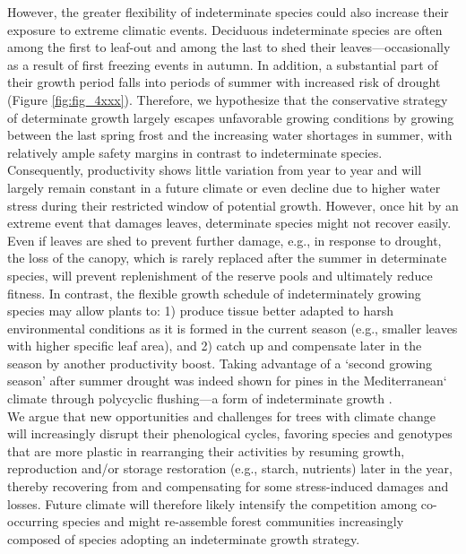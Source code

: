 \documentclass{article}
\begin{document}
However, the greater flexibility of indeterminate species could also increase their exposure to extreme climatic events. Deciduous indeterminate species are often among the first to leaf-out and among the last to shed their leaves---occasionally as a result of first freezing events in autumn. In addition, a substantial part of their growth period falls into periods of summer with increased risk of drought (Figure \ref{fig:fig_4xxx}). 
Therefore, we hypothesize that the conservative strategy of determinate growth largely escapes unfavorable growing conditions by growing between the last spring frost and the increasing water shortages in summer, with relatively ample safety margins in contrast to indeterminate species. Consequently, productivity shows little variation from year to year and will largely remain constant in a future climate or even decline due to higher water stress during their restricted window of potential growth.
However, once hit by an extreme event that damages leaves, determinate species might not recover easily. Even if leaves are shed to prevent further damage, e.g., in response to drought, the loss of the canopy, which is rarely replaced after the summer in determinate species, will prevent replenishment of the reserve pools and ultimately reduce fitness. In contrast, the flexible growth schedule of indeterminately growing species may allow plants to: 1) produce tissue better adapted to harsh environmental conditions as it is formed in the current season (e.g., smaller leaves with higher specific leaf area), and 2) catch up and compensate later in the season by another productivity boost. Taking advantage of a `second growing season' after summer drought was indeed shown for pines in the Mediterranean` climate through polycyclic flushing---a form of indeterminate growth \citep[Figure \ref{fig:fig_2xxx}]{girardPolycyclismFundamentalTree2011}. \\

We argue that new opportunities and challenges for trees with climate change will increasingly disrupt their phenological cycles, favoring species and genotypes that are more plastic in rearranging their activities by resuming growth, reproduction and/or storage restoration (e.g., starch, nutrients) later in the year, thereby recovering from and compensating for some stress-induced damages and losses. Future climate will therefore likely intensify the competition among co-occurring species and might re-assemble forest communities increasingly composed of species adopting an indeterminate growth strategy.
	
\end{document}
